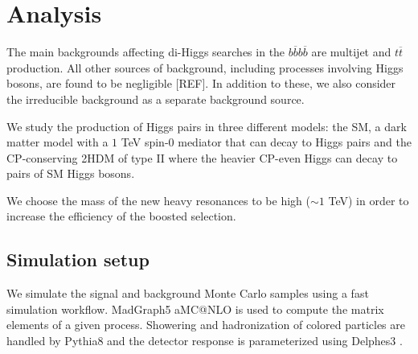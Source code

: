 
\section{Analysis}
\label{sec:imple}


The main backgrounds affecting di-Higgs searches in the $b\overline{b}b\overline{b}$ are multijet and $t\overline{t}$ production. All other sources of background, including processes involving Higgs bosons, are found to be negligible [REF]. In addition to these, we also consider the irreducible background as a separate background source.

We study the production of Higgs pairs in three different models: the SM, a dark matter model with a $1$ TeV spin-$0$ mediator that can decay to Higgs pairs and the CP-conserving 2HDM of type II where the heavier CP-even Higgs can decay to pairs of SM Higgs bosons.

We choose the mass of the new heavy resonances to be high ($\sim 1$ TeV) in order to increase the efficiency of the boosted selection.

\subsection{Simulation setup}
\label{sec:sim}

We simulate the signal and background Monte Carlo samples using a fast simulation workflow. MadGraph5 aMC@NLO \cite{MG5} is used to compute the matrix elements of a given process. Showering and hadronization of colored particles are handled by Pythia8 \cite{Pythia8} and the detector response is parameterized using Delphes3 \cite{Delphes}. 

